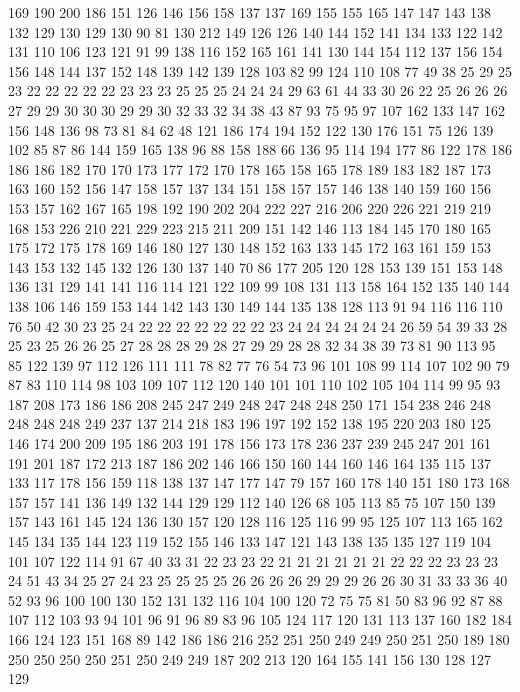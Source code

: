 169 190 200 186 151 126 146 156 158 137 137 169 155 155 165 147 147 143 138 132
129 130 129 130 90 81 130 212 149 126 126 140 144 152 141 134 133 122 142 131
110 106 123 121 91 99 138 116 152 165 161 141 130 144 154 112 137 156 154 156
148 144 137 152 148 139 142 139 128 103 82 99 124 110 108 77 49 38 25 29
25 23 22 22 22 22 22 23 23 23 25 25 25 24 24 24 29 63 61 44
33 30 26 22 25 26 26 26 27 29 29 30 30 30 29 29 30 32 33 32
34 38 43 87 93 75 95 97 107 162 133 147 162 156 148 136 98 73 81 84
62 48 121 186 174 194 152 122 130 176 151 75 126 139 102 85 87 86 144 159
165 138 96 88 158 188 66 136 95 114 194 177 86 122 178 186 186 186 182 170
170 173 177 172 170 178 165 158 165 178 189 183 182 187 173 163 160 152 156 147
158 157 137 134 151 158 157 157 146 138 140 159 160 156 153 157 162 167 165 198
192 190 202 204 222 227 216 206 220 226 221 219 219 168 153 226 210 221 229 223
215 211 209 151 142 146 113 184 145 170 180 165 175 172 175 178 169 146 180 127
130 148 152 163 133 145 172 163 161 159 153 143 153 132 145 132 126 130 137 140
70 86 177 205 120 128 153 139 151 153 148 136 131 129 141 141 116 114 121 122
109 99 108 131 113 158 164 152 135 140 144 138 106 146 159 153 144 142 143 130
149 144 135 138 128 113 91 94 116 116 110 76 50 42 30 23 25 24 22 22
22 22 22 22 22 23 24 24 24 24 24 24 26 59 54 39 33 28 25 23
25 26 26 25 27 28 28 28 29 28 27 29 29 28 28 32 34 38 39 73
81 90 113 95 85 122 139 97 112 126 111 111 78 82 77 76 54 73 96 101
108 99 114 107 102 90 79 87 83 110 114 98 103 109 107 112 120 140 101 101
110 102 105 104 114 99 95 93 187 208 173 186 186 208 245 247 249 248 247 248
248 250 171 154 238 246 248 248 248 248 249 237 137 214 218 183 196 197 192 152
138 195 220 203 180 125 146 174 200 209 195 186 203 191 178 156 173 178 236 237
239 245 247 201 161 191 201 187 172 213 187 186 202 146 166 150 160 144 160 146
164 135 115 137 133 117 178 156 159 118 138 137 147 177 147 79 157 160 178 140
151 180 173 168 157 157 141 136 149 132 144 129 129 112 140 126 68 105 113 85
75 107 150 139 157 143 161 145 124 136 130 157 120 128 116 125 116 99 95 125
107 113 165 162 145 134 135 144 123 119 152 155 146 133 147 121 143 138 135 135
127 119 104 101 107 122 114 91 67 40 33 31 22 23 23 22 21 21 21 21
21 21 22 22 22 23 23 23 24 51 43 34 25 27 24 23 25 25 25 25
26 26 26 26 29 29 29 26 26 30 31 33 33 36 40 52 93 96 100 100
130 152 131 132 116 104 100 120 72 75 75 81 50 83 96 92 87 88 107 112
103 93 94 101 96 91 96 89 83 96 105 124 117 120 131 113 137 160 182 184
166 124 123 151 168 89 142 186 186 216 252 251 250 249 249 250 251 250 189 180
250 250 250 250 251 250 249 249 187 202 213 120 164 155 141 156 130 128 127 129
